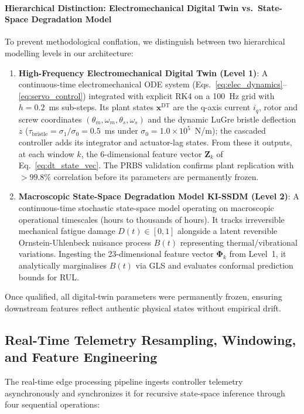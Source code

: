 \documentclass[a4paper,fleqn]{cas-dc}
\newcommand{\bPhi}{\bm{\Phi}}
\begin{document}
\paragraph{Hierarchical Distinction: Electromechanical Digital Twin vs.\ State-Space Degradation Model}
To prevent methodological conflation, we distinguish between two hierarchical modelling levels in our architecture:
\begin{enumerate}[label=(\roman*),leftmargin=2.2em]
    \item \textbf{High-Frequency Electromechanical Digital Twin (Level 1)}: A continuous-time electromechanical ODE system (Eqs.~\eqref{eq:elec_dynamics}--\eqref{eq:servo_control}) integrated with explicit RK4 on a 100~Hz grid with $h = 0.2$~ms sub-steps. Its plant states $\mathbf{x}^{\mathrm{DT}}$ are the q-axis current $i_q$, rotor and screw coordinates $(\theta_m,\omega_m,\theta_s,\omega_s)$ and the dynamic LuGre bristle deflection $z$ ($\tau_{\mathrm{bristle}} = \sigma_1/\sigma_0 = 0.5$~ms under $\sigma_0 = 1.0 \times 10^5$~N/m); the cascaded controller adds its integrator and actuator-lag states. From these it outputs, at each window $k$, the 6-dimensional feature vector $\mathbf{Z}_k$ of Eq.~\eqref{eq:dt_state_vec}. The PRBS validation confirms plant replication with $>99.8\%$ correlation before its parameters are permanently frozen.
    \item \textbf{Macroscopic State-Space Degradation Model KI-SSDM (Level 2)}: A continuous-time stochastic state-space model operating on macroscopic operational timescales (hours to thousands of hours). It tracks irreversible mechanical fatigue damage $D(t) \in [0, 1]$ alongside a latent reversible Ornstein-Uhlenbeck nuisance process $B(t)$ representing thermal/vibrational variations. Ingesting the 23-dimensional feature vector $\bPhi_k$ from Level~1, it analytically marginalises $B(t)$ via GLS and evaluates conformal prediction bounds for RUL.
\end{enumerate}
Once qualified, all digital-twin parameters were permanently frozen, ensuring downstream features reflect authentic physical states without empirical drift.

\subsection{Real-Time Telemetry Resampling, Windowing, and Feature Engineering}
\label{subsec:realtime_features}

The real-time edge processing pipeline ingests controller telemetry asynchronously and synchronizes it for recursive state-space inference through four sequential operations:
\end{document}
